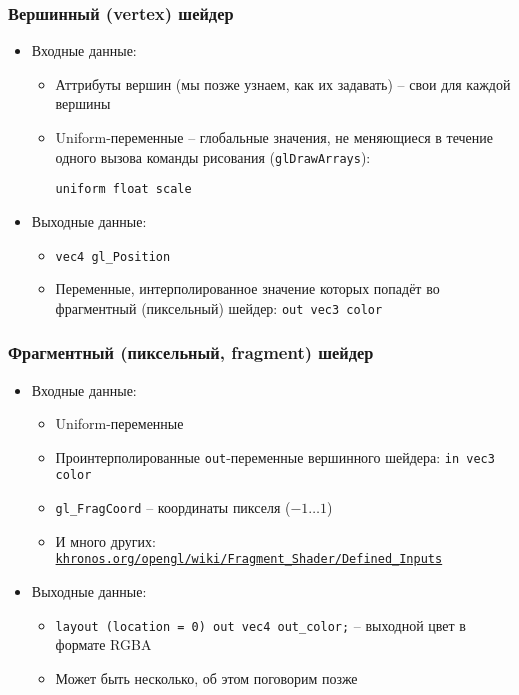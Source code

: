 \documentclass{beamer}
\begin{document}
\begin{frame}[fragile]
\frametitle{Вершинный (vertex) шейдер}
\begin{itemize}
\pause
\item Входные данные:
\pause
\begin{itemize}
\item Аттрибуты вершин (мы позже узнаем, как их задавать) -- свои для каждой вершины
\pause
\item Uniform-переменные -- глобальные значения, не меняющиеся в течение одного вызова команды рисования (\verb|glDrawArrays|):

\verb|uniform float scale|
\end{itemize}
\pause
\item Выходные данные:
\begin{itemize}
\item \verb|vec4 gl_Position|
\pause
\item Переменные, интерполированное значение которых попадёт во фрагментный (пиксельный) шейдер: \verb|out vec3 color|
\end{itemize}
\end{itemize}
\end{frame}

\begin{frame}[fragile]
\frametitle{Фрагментный (пиксельный, fragment) шейдер}
\begin{itemize}
\pause
\item Входные данные:
\pause
\begin{itemize}
\item Uniform-переменные
\pause
\item Проинтерполированные \verb|out|-переменные вершинного шейдера: \verb|in vec3 color|
\pause
\item \verb|gl_FragCoord| -- координаты пикселя (\begin{math}-1 \dots 1\end{math})
\pause
\item И много других: \href{https://www.khronos.org/opengl/wiki/Fragment_Shader/Defined_Inputs}{\nolinkurl{khronos.org/opengl/wiki/Fragment\_Shader/Defined\_Inputs}}
\end{itemize}
\pause
\item Выходные данные:
\begin{itemize}
\item \verb|layout (location = 0) out vec4 out_color;| -- выходной цвет в формате RGBA
\pause
\item Может быть несколько, об этом поговорим позже
\end{itemize}
\end{itemize}
\end{frame}
\end{document}
